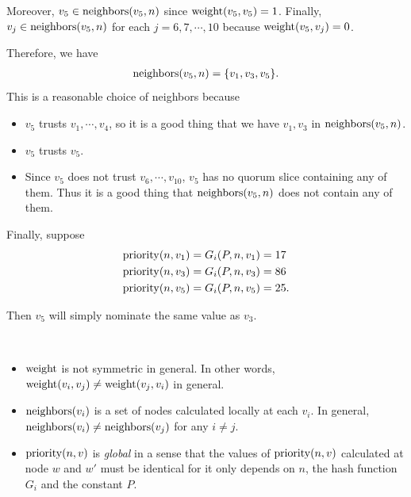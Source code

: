 \begin{exmp}
    Moreover, $v_5 \in \operatorname{neighbors}(v_5, n)$ since $\operatorname{weight}(v_5, v_5) = 1$.
    Finally, $v_j \in \operatorname{neighbors}(v_5, n)$ for each $j = 6, 7, \cdots, 10$ because $\operatorname{weight}(v_5, v_j) = 0$.

    Therefore, we have
    \begin{align*}
        \operatorname{neighbors}(v_5, n) = \{ v_1, v_3, v_5 \}.
    \end{align*}
    This is a reasonable choice of neighbors because
    \begin{itemize}
        \item
            $v_5$ trusts $v_1, \cdots, v_4$, so it is a good thing that we have $v_1, v_3$ in $\operatorname{neighbors}(v_5, n)$.
        \item
            $v_5$ trusts $v_5$.
        \item
            Since $v_5$ does not trust $v_6, \cdots, v_{10}$, $v_5$ has no quorum slice containing any of them.
            Thus it is a good thing that $\operatorname{neighbors}(v_5, n)$ does not contain any of them.
    \end{itemize}

    Finally, suppose
    \begin{align*}
        \operatorname{priority}(n, v_1) &= G_i(P, n, v_1) = 17 \\
        \operatorname{priority}(n, v_3) &= G_i(P, n, v_3) = 86 \\
        \operatorname{priority}(n, v_5) &= G_i(P, n, v_5) = 25.
    \end{align*}

    Then $v_5$ will simply nominate the same value as $v_3$.
\end{exmp}

\begin{rem}
    $ $
    \begin{itemize}
        \item
            $\operatorname{weight}$ is not symmetric in general.
            In other words, $\operatorname{weight}(v_i, v_j) \ne \operatorname{weight}(v_j, v_i)$ in general.
        \item
            $\operatorname{neighbors}(v_i)$ is a set of nodes calculated locally at each $v_i$.
            In general, $\operatorname{neighbors}(v_i) \ne \operatorname{neighbors}(v_j)$ for any $i \ne j$.
        \item
            $\operatorname{priority}(n, v)$ is \textit{global} in a sense that the values of $\operatorname{priority}(n, v)$ calculated at node $w$ and $w'$ must be identical for it only depends on $n$, the hash function $G_i$ and the constant $P$.
    \end{itemize}
\end{rem}

